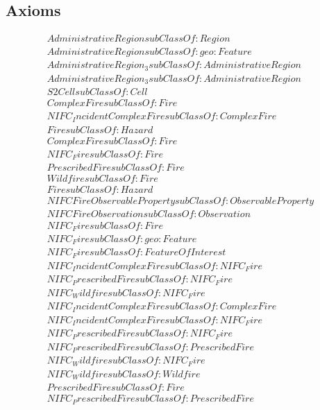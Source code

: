 \subsection{Axioms}
\begin{align}
  AdministrativeRegion subClassOf: Region\\
  AdministrativeRegion subClassOf: geo:Feature\\
  AdministrativeRegion_3 subClassOf: AdministrativeRegion\\
  AdministrativeRegion_3 subClassOf: AdministrativeRegion\\
  S2Cell subClassOf: Cell\\
  ComplexFire subClassOf: Fire\\
  NIFC_IncidentComplexFire subClassOf: ComplexFire\\
  Fire subClassOf: Hazard\\
  ComplexFire subClassOf: Fire\\
  NIFC_Fire subClassOf: Fire\\
  PrescribedFire subClassOf: Fire\\
  Wildfire subClassOf: Fire\\
  Fire subClassOf: Hazard\\
  NIFCFireObservableProperty subClassOf: ObservableProperty\\
  NIFCFireObservation subClassOf: Observation\\
  NIFC_Fire subClassOf: Fire\\
  NIFC_Fire subClassOf: geo:Feature\\
  NIFC_Fire subClassOf: FeatureOfInterest\\
  NIFC_IncidentComplexFire subClassOf: NIFC_Fire\\
  NIFC_PrescribedFire subClassOf: NIFC_Fire\\
  NIFC_Wildfire subClassOf: NIFC_Fire\\
  NIFC_IncidentComplexFire subClassOf: ComplexFire\\
  NIFC_IncidentComplexFire subClassOf: NIFC_Fire\\
  NIFC_PrescribedFire subClassOf: NIFC_Fire\\
  NIFC_PrescribedFire subClassOf: PrescribedFire\\
  NIFC_Wildfire subClassOf: NIFC_Fire\\
  NIFC_Wildfire subClassOf: Wildfire\\
  PrescribedFire subClassOf: Fire\\
  NIFC_PrescribedFire subClassOf: PrescribedFire\\

\end{align}
